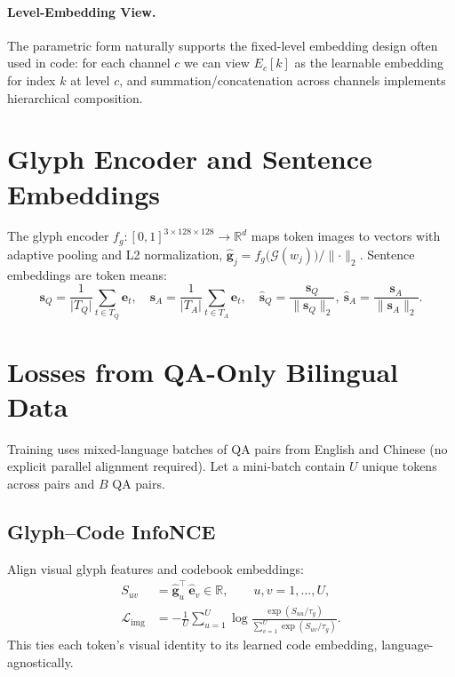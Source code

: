 \documentclass[11pt]{article}
\begin{document}
\paragraph{Level-Embedding View.} The parametric form naturally supports the fixed-level embedding design often used in code: for each channel \(c\) we can view \(E_c[k]\) as the learnable embedding for index \(k\) at level \(c\), and summation/concatenation across channels implements hierarchical composition.

\section{Glyph Encoder and Sentence Embeddings}
The glyph encoder \(f_g: [0,1]^{3\times 128\times 128}\to\mathbb{R}^d\) maps token images to vectors with adaptive pooling and L2 normalization, \(\hat{\mathbf{g}}_j= f_g\big(\mathcal{G}(w_j)\big)/\lVert\cdot\rVert_2\). Sentence embeddings are token means:
\begin{equation}
  \mathbf{s}_Q=\frac{1}{\lvert T_Q\rvert}\sum_{t\in T_Q} \mathbf{e}_t,\quad \mathbf{s}_A=\frac{1}{\lvert T_A\rvert}\sum_{t\in T_A} \mathbf{e}_t,\quad \hat{\mathbf{s}}_Q=\frac{\mathbf{s}_Q}{\lVert\mathbf{s}_Q\rVert_2},\ \hat{\mathbf{s}}_A=\frac{\mathbf{s}_A}{\lVert\mathbf{s}_A\rVert_2}.
\end{equation}

\section{Losses from QA-Only Bilingual Data}
Training uses mixed-language batches of QA pairs from English and Chinese (no explicit parallel alignment required). Let a mini-batch contain \(U\) unique tokens across pairs and \(B\) QA pairs.

\subsection{Glyph--Code InfoNCE}
Align visual glyph features and codebook embeddings:
\begin{align}
  S_{uv}&=\hat{\mathbf{g}}_u^{\top}\,\hat{\mathbf{e}}_v\in\mathbb{R},\qquad u,v=1,\ldots,U,\\
  \mathcal{L}_{\text{img}}&= -\frac{1}{U}\sum_{u=1}^U \log\frac{\exp(S_{uu}/\tau_g)}{\sum_{v=1}^U \exp(S_{uv}/\tau_g)}.\label{eq:img}
\end{align}
This ties each token’s visual identity to its learned code embedding, language-agnostically.
\end{document}
